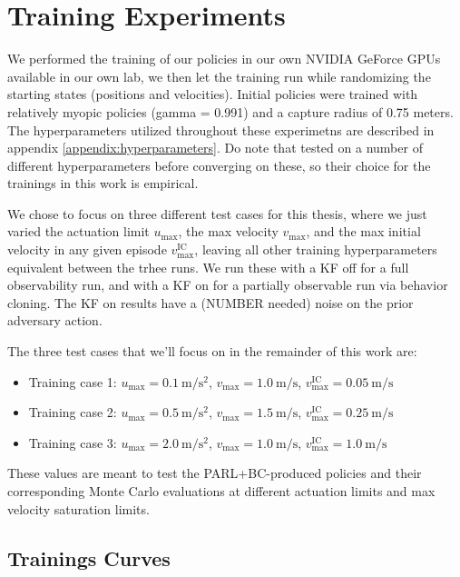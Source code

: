 \chapter{Training Experiments}


We performed the training of our policies in our own NVIDIA GeForce GPUs available in our own lab, we then let the training run while randomizing the starting states (positions and velocities). Initial policies were trained with relatively myopic policies (gamma = 0.991) and a capture radius of 0.75 meters. The hyperparameters utilized throughout these experimetns  are described in appendix \ref{appendix:hyperparameters}. Do note that tested on a number of different hyperparameters before converging on these, so their choice for the trainings in this work is empirical.


We chose to focus on three different test cases for this thesis, where we just varied the actuation limit $u_{\max}$, the max velocity $v_{\max}$, and the max initial velocity in any given episode $v_{\max}^{\mathrm{IC}}$, leaving all other training hyperparameters equivalent between the trhee runs. We run these with a KF off for a full observability run, and with a KF on for a partially observable run via behavior cloning. The KF on results have a (NUMBER needed) noise on the prior adversary action.

The three test cases that we'll focus on in the remainder of this work are:


\begin{itemize}
    \item Training case 1: $u_{\max} = 0.1~\mathrm{m/s^2}$, $v_{\max} = 1.0~\mathrm{m/s}$, $v_{\max}^{\mathrm{IC}} = 0.05~\mathrm{m/s}$
    \item Training case 2: $u_{\max} = 0.5~\mathrm{m/s^2}$, $v_{\max} = 1.5~\mathrm{m/s}$, $v_{\max}^{\mathrm{IC}} = 0.25~\mathrm{m/s}$
    \item Training case 3: $u_{\max} = 2.0~\mathrm{m/s^2}$, $v_{\max} = 1.0~\mathrm{m/s}$, $v_{\max}^{\mathrm{IC}} = 1.0~\mathrm{m/s}$
\end{itemize}

These values are meant to test the PARL+BC-produced policies and their corresponding Monte Carlo evaluations at different actuation limits and max velocity saturation limits.


\section{Trainings Curves}
\label{sec:Net_Training_Curves}

